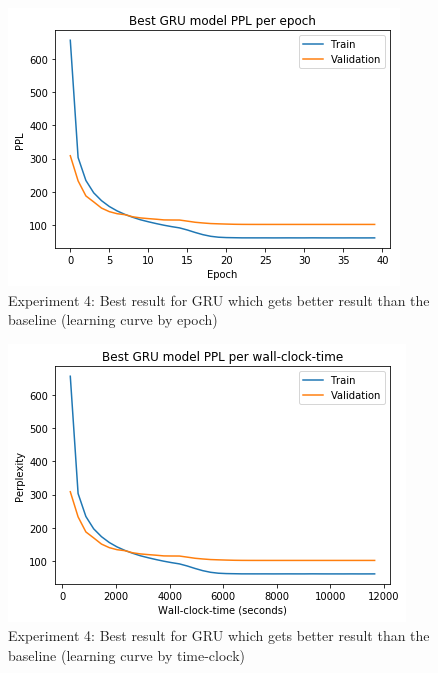 \begin{itemize}
\begin{figure}[H]
	\centering
	\includegraphics[scale=0.8]{Q4-3_GRU_1epoch.png}
	\caption{Experiment 4: Best result for GRU which gets better result than the baseline (learning curve by epoch)}
	\label{fig:fig20GRU}
\end{figure}
\begin{figure}[H]
	\centering
	\includegraphics[scale=0.8]{Q4-3_GRU_1time.png}
	\caption{Experiment 4: Best result for GRU which gets better result than the baseline (learning curve by time-clock)}
	\label{fig:fig20bGRU}
\end{figure}


\end{itemize}
